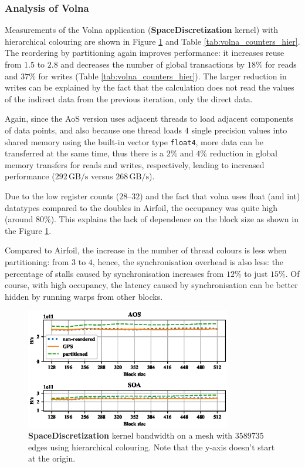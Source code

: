 \subsubsection{Analysis of Volna}

Measurements of the Volna application (\textbf{SpaceDiscretization} kernel)
with hierarchical colouring are shown in Figure \ref{fig:volna_bw-vs-bs_hier} and Table \ref{tab:volna_counters_hier}. The
reordering by partitioning again improves performance: it increases reuse from
$1.5$ to $2.8$ and decreases the number of global transactions by $18\%$ for
reads and $37\%$ for writes (Table \ref{tab:volna_counters_hier}). The larger
reduction in writes can be explained by the fact that the calculation does not
read the values of the indirect data from the previous iteration, only the
direct data.

Again, since the AoS version uses adjacent threads to load adjacent components
of data points, and also because one thread loads $4$ single precision values
into shared memory using the built-in vector type \lstinline!float4!, more data
can be transferred at the same time, thus there is a $2\%$ and $4\%$ reduction
in global memory transfers for reads and writes, respectively, leading to
increased performance ($292\,\text{GB/s}$ versus $268\,\text{GB/s}$).

Due to the low register counts ($28$--$32$) and the fact that volna uses float
(and int) datatypes compared to the doubles in Airfoil, the occupancy was quite
high (around $80\%$).  This explains the lack of dependence on the block size as
shown in the Figure \ref{fig:volna_bw-vs-bs_hier}.

Compared to Airfoil, the increase in the number of thread colours is less when
partitioning: from $3$ to $4$, hence, the synchronisation overhead is also less:
the percentage of stalls caused by synchronisation increases from $12\%$ to just
$15\%$. Of course, with high occupancy, the latency caused by synchronisation
can be better hidden by running warps from other blocks.


\begin{figure}[Htbp]
  \centering
  \includegraphics[width=9cm]{fig/volna_bw-vs-bs_hier.eps}
  \caption{\textbf{SpaceDiscretization} kernel bandwidth on a mesh with
  $3589735$ edges using hierarchical colouring. Note that the y-axis doesn't
  start at the origin.}
  \label{fig:volna_bw-vs-bs_hier}
\end{figure}

